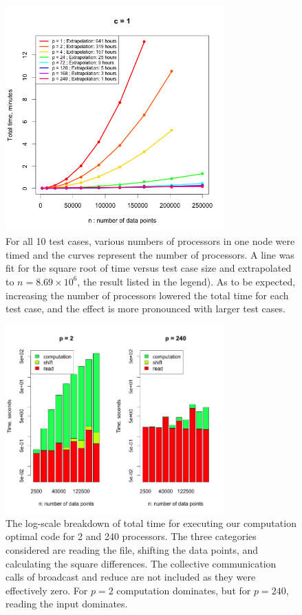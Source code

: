 \begin{figure}[!h]
   \centering
   \includegraphics[width=0.75\textwidth]{./fig/timing.png} %
   \caption{For all 10 test cases, various numbers of processors in one node were timed and the curves represent the number of processors. A line was fit for the square root of time versus test case size and extrapolated to $n=8.69\times10^6$, the result listed in the legend). As to be expected, increasing the number of processors lowered the total time for each test case, and the effect is more pronounced with larger test cases. }
   \label{fig:comp_timings}
\end{figure}

\begin{figure}[!h]
   \centering
   \includegraphics[width=0.75\textwidth]{./fig/comp_breakdown.png} %
   \caption{The log-scale breakdown of total time for executing our computation optimal code for 2 and 240 processors. The three categories considered are reading the file, shifting the data points, and calculating the square differences. The collective communication calls of broadcast and reduce are not included as they were effectively zero. For $p=2$ computation dominates, but for $p=240$, reading the input dominates.}
   \label{fig:comp_breakdown}
\end{figure}

